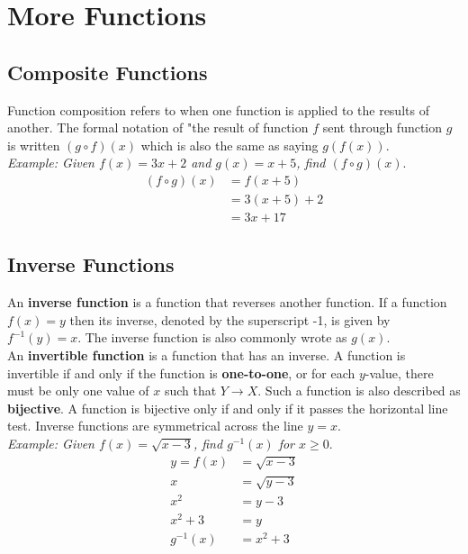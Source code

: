 \section{More Functions}

    \subsection{Composite Functions}
        Function composition refers to when one function is applied to the results of another.
        The formal notation of "the result of function $f$ sent through function $g$ is written
        $(g\circ f)(x)$ which is also the same as saying $g(f(x))$. \\

        \noindent \color{blue} \textit{Example: Given $f(x)=3x+2$ and $g(x)=x+5$,
        find $(f\circ g)(x)$}. \color{black} \\

        \begin{align*}
            (f\circ g)(x) &= f(x+5) \\
            &= 3(x+5)+2 \\
            &= 3x+17
        \end{align*}



    \subsection{Inverse Functions}
        An \textbf{inverse function} is a function that reverses another function. If a function
        $f(x)=y$ then its inverse, denoted by the superscript -1, is given by $f^{-1}(y)=x$.
        The inverse function is also commonly wrote as $g(x)$. \\

        \noindent An \textbf{invertible function} is a function that has an inverse. A function
        is invertible if and only if the function is \textbf{one-to-one}, or for each $y$-value,
        there must be only one value of $x$ such that $Y\rightarrow X$. Such a function is also
        described as \textbf{bijective}. A function is bijective only if and only if it passes the
        horizontal line test. Inverse functions are symmetrical across the line $y=x$. \\

        \noindent \color{blue} \textit{Example: Given $f(x)=\sqrt{x-3}$, find $g^{-1}(x)$ for
        $x\geq0$}. \color{black} \\

        \begin{align*}
            y=f(x) &= \sqrt{x-3} \\
            x &= \sqrt{y-3} \\
            x^2 &= y-3 \\
            x^2+3 &= y \\
            g^{-1}(x) &= x^2+3
        \end{align*}